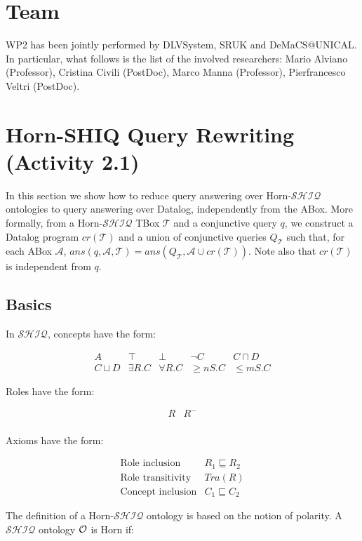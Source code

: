 \documentclass[oneside]{book}
\newcommand{\shiq}{$\mathcal{SHIQ}$\xspace}
\newcommand{\hshiq}{Horn-\shiq\xspace}
\newcommand{\T}{\mathcal{T}}
\newcommand{\A}{\mathcal{A}}
\newcommand{\dlisa}{\sqsubseteq}
\newcommand{\dland}{\sqcap}
\newcommand{\dlor}{\sqcup}
\begin{document}
\section{Team}
WP2 has been jointly performed by DLVSystem, SRUK and DeMaCS@UNICAL. In particular, what follows is the list of the involved researchers: Mario Alviano (Professor), Cristina Civili (PostDoc), Marco Manna (Professor), Pierfrancesco Veltri (PostDoc).

\section{Horn-SHIQ Query Rewriting (Activity 2.1)}
In this section we show how to reduce query answering over \hshiq ontologies
to query answering over Datalog, independently from the ABox.
%
More formally, from a \hshiq TBox $\T$ and a conjunctive
query $q$, we construct a Datalog program $cr(\T)$ and a union of conjunctive queries $Q_{\T}$ such that, for each ABox $\A$, $\mathit{ans}(q,\A,\T) =  
\mathit{ans}(Q_{\T},\A \cup cr(\T))$. Note also that $cr(\T)$ is independent from $q$.


\subsection{Basics}

In \shiq, concepts have the form:

\[
\begin{array}{lllll}
A &  \top & \bot & \neg C & C \dland D \\
C \dlor D & \exists R.C & \forall R.C & \geq n S.C & \leq m S.C
\end{array}
\]

Roles have the form:

\[
\begin{array}{ll}
R &  R^-\\
\end{array}
\]

Axioms have the form:

\[
\begin{array}{ll}
\text{Role inclusion} & R_1 \dlisa R_2 \\
\text{Role transitivity} & Tra(R) \\
\text{Concept inclusion} & C_1 \dlisa C_2
\end{array}
\] 

The definition of a \hshiq ontology is based on the notion of polarity. A \shiq ontology  $\cal O$ is Horn if:
\end{document}
